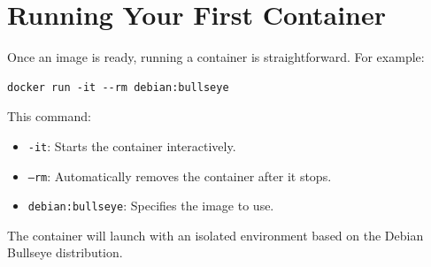 \section{Running Your First Container}
Once an image is ready, running a container is straightforward. For example:
\begin{verbatim}
docker run -it --rm debian:bullseye    
\end{verbatim}
This command:
\begin{itemize}
    \item \texttt{-it}: Starts the container interactively.
    \item \texttt{--rm}: Automatically removes the container after it stops.
    \item \texttt{debian:bullseye}: Specifies the image to use.
\end{itemize}
The container will launch with an isolated environment based on the Debian Bullseye distribution.
